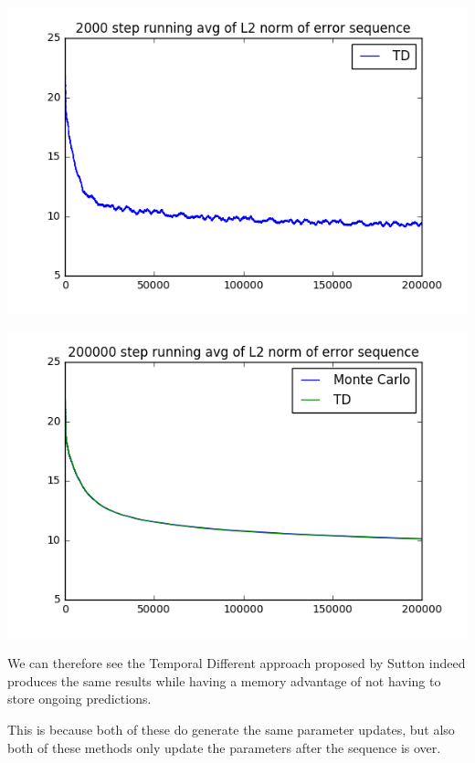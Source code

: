 \documentclass{article}
\begin{document}
\begin{center}
  \begin{minipage}{.5\textwidth}
    \includegraphics[width=\linewidth]{figures/plot_TD_L2_norm_error.png}
  \end{minipage}%
  \begin{minipage}{.5\textwidth}
    \includegraphics[width=\linewidth]{figures/plot_both_L2_norm_error.png}
  \end{minipage}
\end{center}

We can therefore see the Temporal Different approach proposed by Sutton indeed produces the same results while having a memory advantage of not having to store ongoing predictions.

This is because both of these do generate the same parameter updates, but also both of these methods only update the parameters after the sequence is over.
\end{document}
